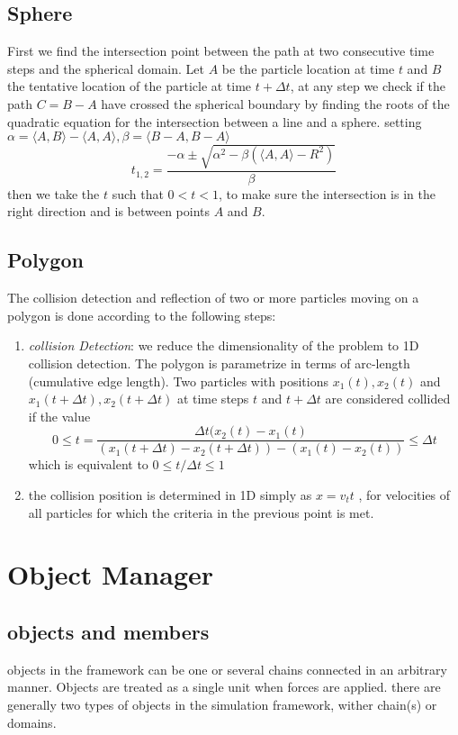 \documentclass[12pt]{report}
\begin{document}
\subsection{Sphere}
First we find the intersection point between the path at two consecutive time steps and the spherical domain. Let $A$ be the particle location at time $t$ and $B$ the tentative location of the particle at time $t+\Delta t$, at any step we check if the path $C=B-A$ have crossed the spherical boundary by finding the roots of the quadratic equation for the intersection between a line and a sphere. setting $\alpha= \langle A,B \rangle -\langle A,A \rangle , \beta = \langle B-A,B-A \rangle$
\begin{equation*}
t_{1,2}=\frac{-\alpha \pm \sqrt{\alpha^2-\beta (\langle A,A \rangle -R^2)}}{\beta}
\end{equation*}
then we take the $t$ such that $0<t<1$, to make sure the intersection is in the right direction and is between points $A$ and $B$.

\subsection{Polygon}
The collision detection and reflection of two or more particles moving on a polygon is done according to the following steps:
\begin{enumerate}
\item \textit{collision Detection}: we reduce the dimensionality of the problem to 1D collision detection. The polygon is parametrize in terms of arc-length (cumulative edge length). Two particles with positions $x_1(t), x_2(t)$ and $x_1(t+\Delta t), x_2(t+\Delta t)$ at time steps $t$ and $t+\Delta t$ are considered collided if the value 
\begin{equation*}
0 \leq t= \frac{\Delta t (x_2(t)-x_1(t)}{(x_1(t+\Delta t)-x_2(t+\Delta t))-(x_1(t)-x_2(t))}\leq \Delta t
\end{equation*}
which is equivalent to $0\leq t/\Delta t \leq 1$ 
\item the collision position is determined in 1D simply as $x=v_tt$
, for velocities of all particles for which the criteria in the previous point is met.
\end{enumerate}



\section{Object Manager}
\subsection{objects and members}
objects in the framework can be one or several chains connected in an arbitrary manner. Objects are treated as a single unit when forces are applied. 
there are generally two types of objects in the simulation framework, wither  chain(s) or domains. 
\end{document}
